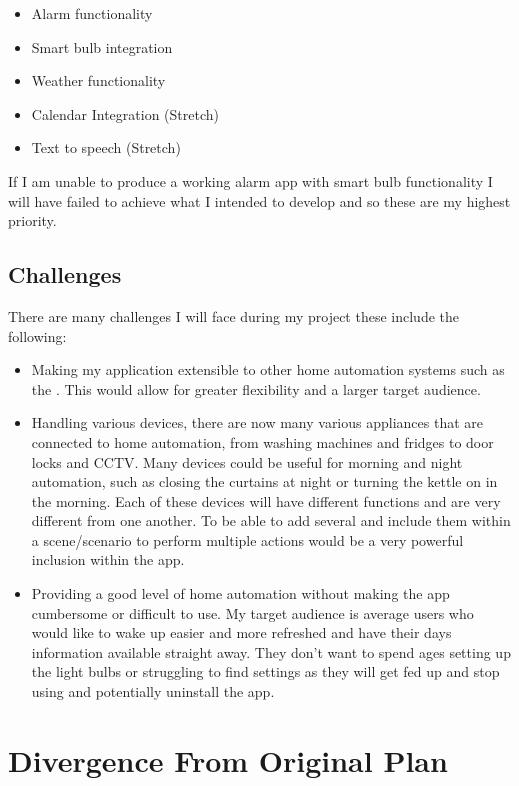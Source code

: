 \begin{itemize}
\tightlist
\item
  Alarm functionality
\item
  Smart bulb integration
\item
  Weather functionality
\item
  Calendar Integration (Stretch)
\item
  Text to speech (Stretch)
\end{itemize}

If I am unable to produce a working alarm app with smart bulb
functionality I will have failed to achieve what I intended to develop
and so these are my highest priority.

\subsection{Challenges}\label{challenges}

There are many challenges I will face during my project these include
the following:

\begin{itemize}
\item
  Making my application extensible to other home automation systems such
  as the \cite{belkinwemo}. This would allow for greater flexibility and
  a larger target audience.
\item
  Handling various devices, there are now many various appliances that
  are connected to home automation, from washing machines and fridges to
  door locks and CCTV. Many devices could be useful for morning and
  night automation, such as closing the curtains at night or turning the
  kettle on in the morning. Each of these devices will have different
  functions and are very different from one another. To be able to add
  several and include them within a scene/scenario to perform multiple
  actions would be a very powerful inclusion within the app.
\item
  Providing a good level of home automation without making the app
  cumbersome or difficult to use. My target audience is average users
  who would like to wake up easier and more refreshed and have their
  days information available straight away. They don't want to spend
  ages setting up the light bulbs or struggling to find settings as they
  will get fed up and stop using and potentially uninstall the app.
\end{itemize}

\section{Divergence From Original
Plan}\label{divergence-from-original-plan}

